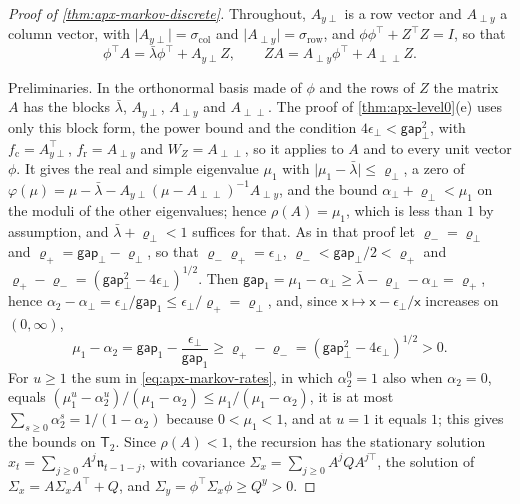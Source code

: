 \begin{proof}[Proof of \cref{thm:apx-markov-discrete}]
Throughout, $A_{y\perp}$ is a row vector and $A_{\perp y}$ a column vector, with $\lvert A_{y\perp}\rvert=\sigma_{\mathrm{col}}$ and $\lvert A_{\perp y}\rvert=\sigma_{\mathrm{row}}$, and $\phi\phi^\top+Z^\top Z=I$, so that
\begin{equation}\label{eq:apx-markov-blocks}
\phi^\top A=\bar\lambda\phi^\top+A_{y\perp}Z,\qquad ZA=A_{\perp y}\phi^\top+A_{\perp\perp}Z .
\end{equation}

Preliminaries. In the orthonormal basis made of $\phi$ and the rows of $Z$ the matrix $A$ has the blocks $\bar\lambda$, $A_{y\perp}$, $A_{\perp y}$ and $A_{\perp\perp}$. The proof of \cref{thm:apx-level0}(e) uses only this block form, the power bound and the condition $4\epsilon_\perp<\mathsf{gap}_\perp^2$, with $f_{\mathrm c}=A_{y\perp}^\top$, $f_{\mathrm r}=A_{\perp y}$ and $W_Z=A_{\perp\perp}$, so it applies to $A$ and to every unit vector $\phi$. It gives the real and simple eigenvalue $\mu_1$ with $\lvert\mu_1-\bar\lambda\rvert\le\varrho_\perp$, a zero of $\varphi(\mu)=\mu-\bar\lambda-A_{y\perp}(\mu-A_{\perp\perp})^{-1}A_{\perp y}$, and the bound $\alpha_\perp+\varrho_\perp<\mu_1$ on the moduli of the other eigenvalues; hence $\rho(A)=\mu_1$, which is less than $1$ by assumption, and $\bar\lambda+\varrho_\perp<1$ suffices for that. As in that proof let $\varrho_-=\varrho_\perp$ and $\varrho_+=\mathsf{gap}_\perp-\varrho_\perp$, so that $\varrho_-\varrho_+=\epsilon_\perp$, $\varrho_-<\mathsf{gap}_\perp/2<\varrho_+$ and $\varrho_+-\varrho_-=(\mathsf{gap}_\perp^2-4\epsilon_\perp)^{1/2}$. Then $\mathsf{gap}_1=\mu_1-\alpha_\perp\ge\bar\lambda-\varrho_\perp-\alpha_\perp=\varrho_+$, hence $\alpha_2-\alpha_\perp=\epsilon_\perp/\mathsf{gap}_1\le\epsilon_\perp/\varrho_+=\varrho_\perp$, and, since $\mathsf x\mapsto\mathsf x-\epsilon_\perp/\mathsf x$ increases on $(0,\infty)$,
\begin{equation*}
\mu_1-\alpha_2=\mathsf{gap}_1-\frac{\epsilon_\perp}{\mathsf{gap}_1}\ge\varrho_+-\varrho_-=(\mathsf{gap}_\perp^2-4\epsilon_\perp)^{1/2}>0 .
\end{equation*}
For $u\ge1$ the sum in \eqref{eq:apx-markov-rates}, in which $\alpha_2^0=1$ also when $\alpha_2=0$, equals $(\mu_1^u-\alpha_2^u)/(\mu_1-\alpha_2)\le\mu_1/(\mu_1-\alpha_2)$, it is at most $\sum_{s\ge0}\alpha_2^s=1/(1-\alpha_2)$ because $0<\mu_1<1$, and at $u=1$ it equals $1$; this gives the bounds on $\mathsf T_2$. Since $\rho(A)<1$, the recursion has the stationary solution $x_t=\sum_{j\ge0}A^j\mathfrak n_{t-1-j}$, with covariance $\Sigma_x=\sum_{j\ge0}A^jQA^{j\top}$, the solution of $\Sigma_x=A\Sigma_xA^\top+Q$, and $\Sigma_y=\phi^\top\Sigma_x\phi\ge Q^y>0$.


\end{proof}
